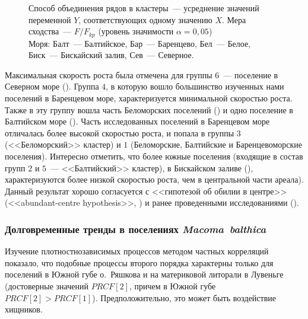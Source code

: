 {\begin{figure}[ht]
{Способ объединения рядов в кластеры~--- усреднение значений переменной $Y$, соответствующих одному значению $X$.
Мера сходства~--- $F/F_{kp}$ (уровень значимости $\alpha = 0,05$)\\
Моря: Балт~--- Балтийское, Бар~--- Баренцево, Бел~--- Белое, Биск~--- Бискайский залив, Сев~--- Северное.}
		\label{ris:growth_cluster_literature}
	\end{figure}
Максимальная скорость роста была отмечена для группы $6$~--- поселение в Северном море (\cite{Vogel_1959}). 
Группа $4$, в которую вошло большинство изученных нами поселений в Баренцевом море, характеризуется минимальной скоростью роста.
Также в эту группу вошла часть Беломорских поселений (\cite{Semenova_1970}) и одно поселение в Балтийском море (\cite{Bergh_1974}).
Часть исследованных поселений в Баренцевом море отличалась более высокой скоростью роста, и попала в группы $3$ (<<Беломорский>> кластер) и $1$ (Беломорские, Балтийские и Баренцевоморские поселения).
Интересно отметить, что более южные поселения (входящие в состав групп $2$ и $5$~--- <<Балтийский>> кластер), в Бискайском заливе (\cite{Bachelet_1980}), характеризуются более низкой скоростью роста, чем в центральной части ареала).
Данный результат хорошо согласуется с <<гипотезой об обилии в центре>> (<<abundant-centre hypothesis>>, \cite{Sagarin_et_al_2006}) и ранее проведенными исследованиями (\cite{Beukema_Meehan_1985, Hummel_et_al_1998}).

\subsubsection*{Долговременные тренды в поселениях \textit{Macoma~balthica}}
Изучение плотностнозависимых процессов методом частных корреляций показало, что подобные процессы второго порядка характерны только для поселений в Южной губе о.~Ряшкова и на материковой литорали в Лувеньге (достоверные значений $PRCF[2]$, причем в Южной губе $PRCF[2] > PRCF[1]$).
Предположительно, это может быть воздействие хищников.

}
